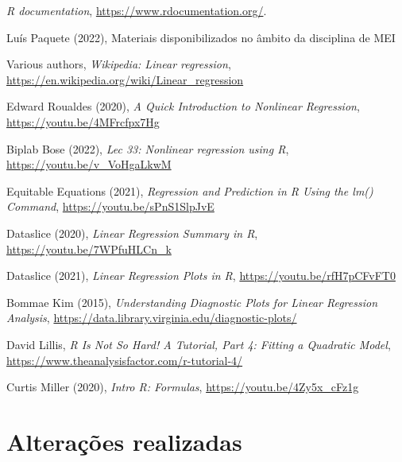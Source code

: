 \documentclass{uofa-eng-assignment}
\begin{document}
\begin{thebibliography}{ht}
\emph{R documentation}, \url{https://www.rdocumentation.org/}.

Luís Paquete (2022), Materiais disponibilizados no âmbito da disciplina de MEI

Various authors, \emph{Wikipedia: Linear regression}, \url{https://en.wikipedia.org/wiki/Linear\_regression}

Edward Roualdes (2020), \emph{A Quick Introduction to Nonlinear Regression}, \url{https://youtu.be/4MFrcfpx7Hg}

Biplab Bose (2022), \emph{Lec 33: Nonlinear regression using R}, \url{https://youtu.be/v\_VoHgaLkwM}

Equitable Equations (2021), \emph{Regression and Prediction in R Using the lm() Command}, \url{https://youtu.be/sPnS1SlpJvE}

Dataslice (2020), \emph{Linear Regression Summary in R}, \url{https://youtu.be/7WPfuHLCn\_k}

Dataslice (2021), \emph{Linear Regression Plots in R}, \url{https://youtu.be/rfH7pCFvFT0}

Bommae Kim (2015), \emph{Understanding Diagnostic Plots for Linear Regression Analysis}, \url{https://data.library.virginia.edu/diagnostic-plots/}

David Lillis, \emph{R Is Not So Hard! A Tutorial, Part 4: Fitting a Quadratic Model}, \url{https://www.theanalysisfactor.com/r-tutorial-4/}

Curtis Miller (2020), \emph{Intro R: Formulas}, \url{https://youtu.be/4Zy5x\_cFz1g}

\end{thebibliography}

\appendix

\section{Alterações realizadas}
\end{document}
